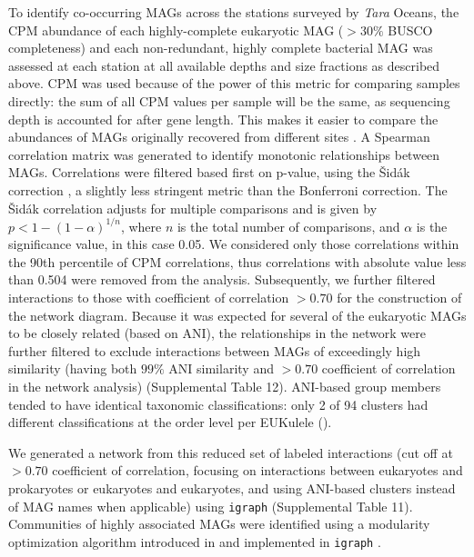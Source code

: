 \documentclass[12pt]{article}
\numberwithin{equation}{section}
\begin{document}
To identify co-occurring MAGs across the stations surveyed by \textit{Tara} Oceans, the CPM abundance of each highly-complete eukaryotic MAG ($>30\%$ BUSCO completeness) and each non-redundant, highly complete bacterial MAG was assessed at each station at all available depths and size fractions as described above. CPM was used because of the power of this metric for comparing samples directly: the sum of all CPM values per sample will be the same, as sequencing depth is accounted for after gene length. This makes it easier to compare the abundances of MAGs originally recovered from different sites \citep{Gradoville_2017}. A Spearman correlation matrix was generated to identify monotonic relationships between MAGs. Correlations were filtered based first on p-value, using the Šidák correction \citep{Sidak_1967}, a slightly less stringent metric than the Bonferroni correction. The Šidák correlation adjusts for multiple comparisons and is given by $p < 1-(1-\alpha)^{1/n}$, where $n$ is the total number of comparisons, and $\alpha$ is the significance value, in this case 0.05. We considered only those correlations within the 90th percentile of CPM correlations, thus correlations with absolute value less than 0.504 were removed from the analysis. Subsequently, we further filtered interactions to those with coefficient of correlation $>0.70$ for the construction of the network diagram. Because it was expected for several of the eukaryotic MAGs to be closely related (based on ANI), the relationships in the network were further filtered to exclude interactions between MAGs of exceedingly high similarity (having both $99\%$ ANI similarity and $>0.70$ coefficient of correlation in the network analysis) (Supplemental Table 12). ANI-based group members tended to have identical taxonomic classifications: only 2 of 94 clusters had different classifications at the order level per EUKulele (). 

We generated a network from this reduced set of labeled interactions (cut off at $>0.70$ coefficient of correlation, focusing on interactions between eukaryotes and prokaryotes or eukaryotes and eukaryotes, and using ANI-based clusters instead of MAG names when applicable) using \texttt{igraph} \citep{igraph,teamr} (Supplemental Table 11). Communities of highly associated MAGs were identified using a modularity optimization algorithm introduced in \cite{blondel2008fast} and implemented in \texttt{igraph} \citep{igraph}.
\end{document}
